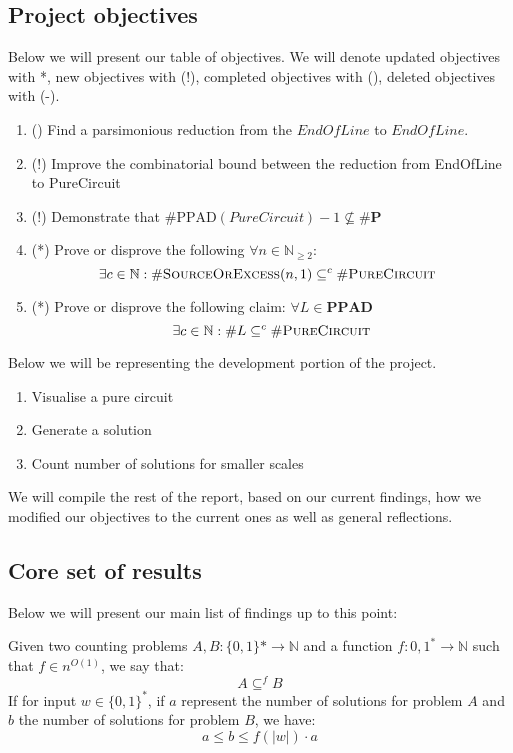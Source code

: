 \subsection{Project objectives}
Below we will present our table of objectives. We will denote updated objectives with
*, new objectives with (!), completed objectives with (\checkmark),  deleted objectives with (-).

\begin{enumerate}[label*=R.\arabic*)]
    \item (\checkmark) Find a parsimonious reduction from the $\textit{EndOfLine}$ to $\textit{EndOfLine}$.
    \item (!) Improve the combinatorial bound between the reduction from EndOfLine to PureCircuit
    \item (!) Demonstrate that $\textbf{\#}\text{PPAD}(PureCircuit)- 1 \not\subseteq \textbf{\#P}$
    \item (*) Prove or disprove the following $\forall n \in \mathbb{N}_{\geq 2}$:
\[
\!\!\!\! \exists c \in \mathbb{N}:  \#\textsc{SourceOrExcess}(n, 1) \subseteq^c \#\textsc{PureCircuit}
\]
\item (*) Prove or disprove the following claim: $\forall L \in \textbf{PPAD}$
    $$
    \exists c \in \mathbb{N}: \#L \subseteq^c \#\textsc{PureCircuit}
    $$
\end{enumerate}

Below we will be representing the development portion of the project.

\begin{enumerate}[label=S.\arabic*)]
    \item Visualise a pure circuit
    \item Generate a solution
    \item Count number of solutions for smaller scales 
\end{enumerate}


We will compile the rest of the report, based on our current findings, how we modified our objectives to
the current ones as well as general reflections.


\subsection{Core set of results}

Below we will present our main list of findings up to this point:

\begin{definition}
    Given two counting problems $A, B : \{0,1\}* \to \mathbb{N}$
    and a function $f : {0,1}^{*} \to \mathbb{N}$ such that $f \in n^{O(1)}$, we
    say that:
    $$
    A \subseteq^f B
    $$
    If for input $w \in \{0,1\}^*$, if $a$ represent the number of solutions
    for problem $A$ and $b$ the number of solutions for problem $B$, we have:
    $$
    a \leq b \leq f(|w|) \cdot a
    $$
\end{definition}

